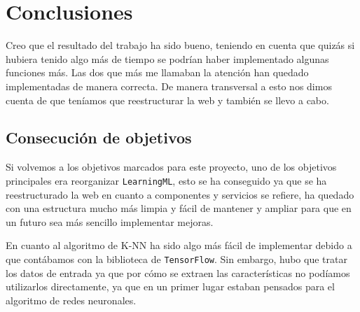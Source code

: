 \documentclass[a4paper, 12pt]{book}
\begin{document}





\cleardoublepage
\chapter{Conclusiones}
\label{chap:conclusiones}

Creo que el resultado del trabajo ha sido bueno, teniendo en cuenta que quizás si hubiera tenido algo más de tiempo se podrían haber implementado algunas funciones más. Las dos que más me llamaban la atención han quedado implementadas de manera correcta. De manera transversal a esto nos dimos cuenta de que teníamos que reestructurar la web y también se llevo a cabo.

\section{Consecución de objetivos}
\label{sec:consecucion-objetivos}

Si volvemos a los objetivos marcados para este proyecto, uno de los objetivos principales era reorganizar \texttt{LearningML}, esto se ha conseguido ya que se ha reestructurado la web en cuanto a componentes y servicios se refiere, ha quedado con una estructura mucho más limpia y fácil de mantener y ampliar para que en un futuro sea más sencillo implementar mejoras.

En cuanto al algoritmo de K-NN ha sido algo más fácil de implementar debido a que contábamos con la biblioteca de \texttt{TensorFlow}. Sin embargo, hubo que tratar los datos de entrada ya que por cómo se extraen las características no podíamos utilizarlos directamente, ya que en un primer lugar estaban pensados para el algoritmo de redes neuronales.
\end{document}
